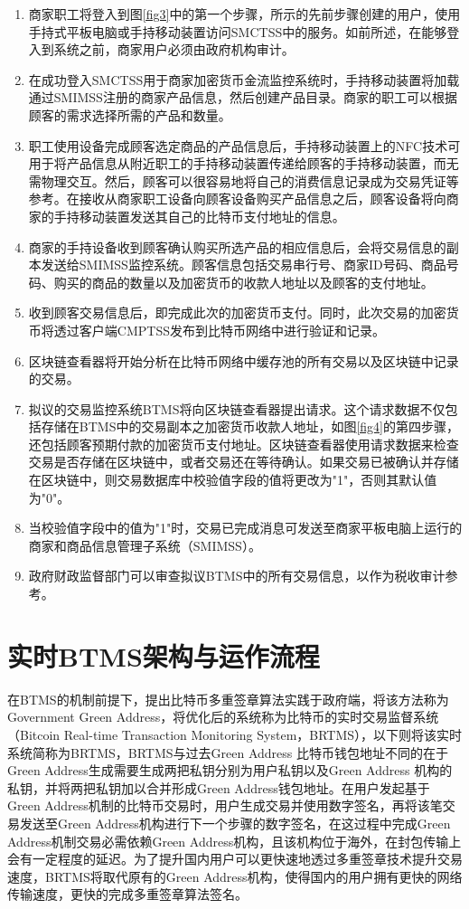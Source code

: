 		\begin{enumerate}
			\item 商家职工将登入到图\ref{fig3}中的第一个步骤，所示的先前步骤创建的用户，使用手持式平板电脑或手持移动装置访问SMCTSS中的服务。如前所述，在能够登入到系统之前，商家用户必须由政府机构审计。
			\item 在成功登入SMCTSS用于商家加密货币金流监控系统时，手持移动装置将加载通过SMIMSS注册的商家产品信息，然后创建产品目录。商家的职工可以根据顾客的需求选择所需的产品和数量。

			\item 职工使用设备完成顾客选定商品的产品信息后，手持移动装置上的NFC技术可用于将产品信息从附近职工的手持移动装置传递给顾客的手持移动装置，而无需物理交互。然后，顾客可以很容易地将自己的消费信息记录成为交易凭证等参考。在接收从商家职工设备向顾客设备购买产品信息之后，顾客设备将向商家的手持移动装置发送其自己的比特币支付地址的信息。
			\item 商家的手持设备收到顾客确认购买所选产品的相应信息后，会将交易信息的副本发送给SMIMSS监控系统。顾客信息包括交易串行号、商家ID号码、商品号码、购买的商品的数量以及加密货币的收款人地址以及顾客的支付地址。
			\item 收到顾客交易信息后，即完成此次的加密货币支付。同时，此次交易的加密货币将透过客户端CMPTSS发布到比特币网络中进行验证和记录。
			\item 区块链查看器将开始分析在比特币网络中缓存池的所有交易以及区块链中记录的交易。
			\item 拟议的交易监控系统BTMS将向区块链查看器提出请求。这个请求数据不仅包括存储在BTMS中的交易副本之加密货币收款人地址，如图\ref{fig4}的第四步骤，还包括顾客预期付款的加密货币支付地址。区块链查看器使用请求数据来检查交易是否存储在区块链中，或者交易还在等待确认。如果交易已被确认并存储在区块链中，则交易数据库中校验值字段的值将更改为"1"，否则其默认值为"0"。
			\item 当校验值字段中的值为"1"时，交易已完成消息可发送至商家平板电脑上运行的商家和商品信息管理子系统（SMIMSS）。
			\item 政府财政监督部门可以审查拟议BTMS中的所有交易信息，以作为税收审计参考。
		\end{enumerate}

\section{实时BTMS架构与运作流程}

		在BTMS的机制前提下，提出比特币多重签章算法实践于政府端，将该方法称为Government Green Address，将优化后的系统称为比特币的实时交易监督系统（Bitcoin Real-time Transaction Monitoring System，BRTMS）\supercite{tanet}，以下则将该实时系统简称为BRTMS，BRTMS与过去Green Address 比特币钱包地址不同的在于Green Address生成需要生成两把私钥分别为用户私钥以及Green Address 机构的私钥，并将两把私钥加以合并形成Green Address钱包地址。在用户发起基于Green Address机制的比特币交易时，用户生成交易并使用数字签名，再将该笔交易发送至Green Address机构进行下一个步骤的数字签名，在这过程中完成Green Address机制交易必需依赖Green Address机构，且该机构位于海外，在封包传输上会有一定程度的延迟。为了提升国内用户可以更快速地透过多重签章技术提升交易速度，BRTMS将取代原有的Green Address机构，使得国内的用户拥有更快的网络传输速度，更快的完成多重签章算法签名。 

